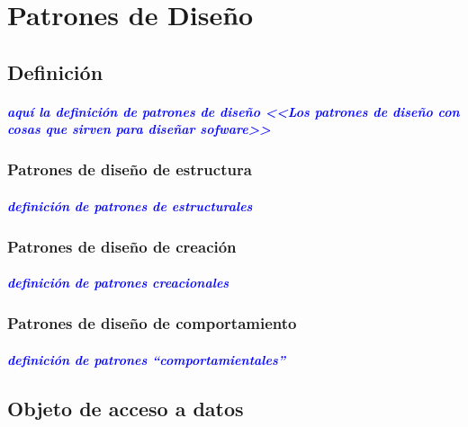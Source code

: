 \chapter{Patrones de Diseño}

\section{Definición}
\paragraph*{\textcolor{blue}{aquí la definición de patrones de diseño <<Los patrones de diseño con cosas que sirven para diseñar sofware>>}}
\subsection{Patrones de diseño de estructura}
\paragraph*{\textcolor{blue}{definición de patrones de estructurales}}
\subsection{Patrones de diseño de creación}
\paragraph*{\textcolor{blue}{definición de patrones creacionales}}
\subsection{Patrones de diseño de comportamiento}
\paragraph*{\textcolor{blue}{definición de patrones ``comportamientales''}}


\section{Objeto de acceso a datos}\label{sec-dao}

